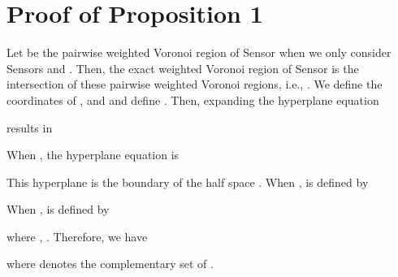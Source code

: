 \documentclass[journal,draftcls,onecolumn,12pt,twoside, narroweqnarray]{IEEEtran}
\begin{document}
\appendices
\section{Proof of Proposition 1}
\begin{IEEEproof}
Let  be the pairwise weighted Voronoi region of Sensor  when we only consider Sensors  and . Then, the exact weighted Voronoi region of Sensor  is the intersection of these pairwise weighted Voronoi regions, i.e., .
We define the coordinates of ,  and  and define . Then, expanding the hyperplane equation

results in

When , the hyperplane equation is

This hyperplane is the boundary of the half space .
When ,   is defined by

When ,   is defined by

where , .
Therefore, we have

where  denotes the complementary set of .
\end{IEEEproof}
\end{document}
